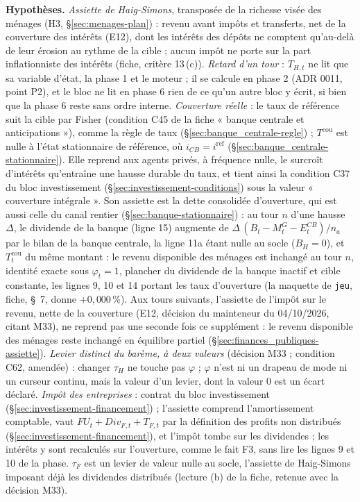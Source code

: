 \documentclass[11pt,a4paper]{article}
\newcommand{\hyp}{\par\noindent\textbf{Hypothèses.} }
\begin{document}
\begin{proposee}
\hyp \emph{Assiette de Haig-Simons}, transposée de la richesse visée des ménages (H3, \S\ref{sec:menages-plan}) : revenu avant impôts et transferts, net de la couverture des intérêts (E12), dont les intérêts des dépôts ne comptent qu'au-delà de leur érosion au rythme de la cible ; aucun impôt ne porte sur la part inflationniste des intérêts (fiche, critère 13\,(c)). \emph{Retard d'un tour} : $T_{H,t}$ ne lit que sa variable d'état, la phase 1 et le moteur ; il se calcule en phase 2 (ADR 0011, point P2), et le bloc ne lit en phase 6 rien de ce qu'un autre bloc y écrit, si bien que la phase 6 reste sans ordre interne. \emph{Couverture réelle} : le taux de référence suit la cible par Fisher (condition C45 de la fiche « banque centrale et anticipations »), comme la règle de taux (\S\ref{sec:banque_centrale-regle}) ; $T^{\mathrm{cou}}$ est nulle à l'état stationnaire de référence, où $i_{\mathit{CB}} = i^{\mathrm{ref}}$ (\S\ref{sec:banque_centrale-stationnaire}). Elle reprend aux agents privés, à fréquence nulle, le surcroît d'intérêts qu'entraîne une hausse durable du taux, et tient ainsi la condition C37 du bloc investissement (\S\ref{sec:investissement-conditions}) sous la valeur « couverture intégrale ». Son assiette est la dette consolidée d'ouverture, qui est aussi celle du canal rentier (\S\ref{sec:banque-stationnaire}) : au tour $n$ d'une hausse $\Delta$, le dividende de la banque (ligne 15) augmente de $\Delta\,(B_t - M^G_t - E^{\mathit{CB}}_t)/n_a$ par le bilan de la banque centrale, la ligne 11a étant nulle au socle ($B_H = 0$), et $T^{\mathrm{cou}}_t$ du même montant : le revenu disponible des ménages est inchangé au tour $n$, identité exacte sous $\varphi_t = 1$, plancher du dividende de la banque inactif et cible constante, les lignes 9, 10 et 14 portant les taux d'ouverture (la maquette de \texttt{jeu}, fiche, \S~7, donne $+0{,}000\,\%$). Aux tours suivants, l'assiette de l'impôt sur le revenu, nette de la couverture (E12, décision du mainteneur du 04/10/2026, citant M33), ne reprend pas une seconde fois ce supplément : le revenu disponible des ménages reste inchangé en équilibre partiel (\S\ref{sec:finances_publiques-assiette}). \emph{Levier distinct du barème, à deux valeurs} (décision M33 ; condition C62, amendée) : changer $\tau_H$ ne touche pas $\varphi$ ; $\varphi$ n'est ni un drapeau de mode ni un curseur continu, mais la valeur d'un levier, dont la valeur 0 est un écart déclaré. \emph{Impôt des entreprises} : contrat du bloc investissement (\S\ref{sec:investissement-financement}) ; l'assiette comprend l'amortissement comptable, vaut $\mathit{FU}_t + \mathit{Div}_{F,t} + T_{F,t}$ par la définition des profits non distribués (\S\ref{sec:investissement-financement}), et l'impôt tombe sur les dividendes ; les intérêts y sont recalculés sur l'ouverture, comme le fait F3, sans lire les lignes 9 et 10 de la phase. $\tau_F$ est un levier de valeur nulle au socle, l'assiette de Haig-Simons imposant déjà les dividendes distribués (lecture (b) de la fiche, retenue avec la décision M33).

\end{proposee}
\end{document}
